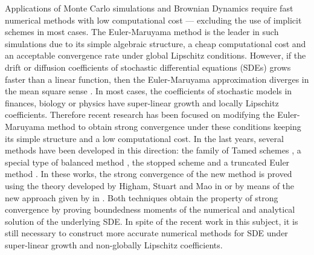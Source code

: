 	Applications of Monte Carlo simulations \cite{Glasserman2004,Giles2008} and  Brownian Dynamics \cite{Cruz2012}
require  fast numerical methods with low computational cost --- excluding the use of 
implicit schemes in most cases. The Euler-Maruyama method is the leader in such  
simulations due to its simple algebraic structure, a cheap computational cost and an acceptable convergence rate 
under global Lipschitz conditions.  However, if the drift or diffusion coefficients of stochastic 
differential equations (SDEs) grows faster than a linear function, then the Euler-Maruyama approximation 
diverges  in the mean square sense \cite{Hutzenthaler2009, Hutzenthaler2012b}. 
In most cases, the coefficients of stochastic  models in finances, biology or physics 
have super-linear growth and locally Lipschitz coefficients. Therefore recent research has been 
focused on modifying the Euler-Maruyama method to obtain strong convergence  under these conditions keeping
its simple structure and a low computational cost. In the last years, 
several methods have been developed in this direction:  the family of  Tamed schemes
\cite{Hutzenthaler2012a, Wang2011, Zong2014,Hutzenthaler2015, Sabanis2015}, 
a special type of balanced method \cite{Tretyakov2013},  the stopped scheme \cite{Liu2013a} and 
a truncated Euler method  \cite{Mao2015}.  In these works, the strong convergence of the new method
is proved using the theory developed by Higham, Stuart and 
Mao in \cite{Higham2002b} or by means of  the new approach given by  \citeauthor*{Hutzenthaler2015} in 
\cite{Hutzenthaler2015}.
Both techniques obtain the property of  strong convergence by proving boundedness moments of the numerical and 
analytical solution of the underlying SDE. In spite of the recent work in this subject,  it is still necessary
to construct more accurate numerical methods for SDE under super-linear growth and 
non-globally Lipschitz coefficients.

